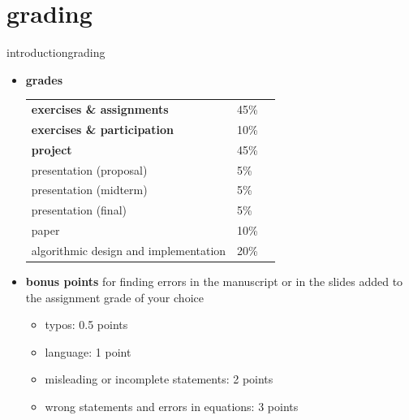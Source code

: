     \section[grades]{grading}
        \begin{frame}{introduction}{grading}
            \vspace{-4mm}
            \begin{itemize}
                \item \textbf{grades}
                    \begin{table}
                    \begin{tabular}{lll}
                        \textbf{exercises \& assignments} & 45\%\\
                        \textbf{exercises \& participation} & 10\%\\
                        \textbf{project} & 45\% \\
                        \quad presentation (proposal) & 5\%\\
                        \quad presentation (midterm) & 5\%\\
                        \quad presentation (final) & 5\%\\
                        \quad paper & 10\%\\
                        \quad algorithmic design and implementation & 20\%\\
                    \end{tabular}   
                    \end{table}
            
                \smallskip
                \item<2->   \textbf{bonus points} for finding errors in the manuscript or in the slides added to the assignment grade of your choice
                    \begin{itemize}
                        \item   typos: 0.5 points
                        \item   language: 1 point
                        \item   misleading or incomplete statements: 2 points
                        \item   wrong statements and errors in equations: 3 points
                    \end{itemize}
            \end{itemize}
        \end{frame}


